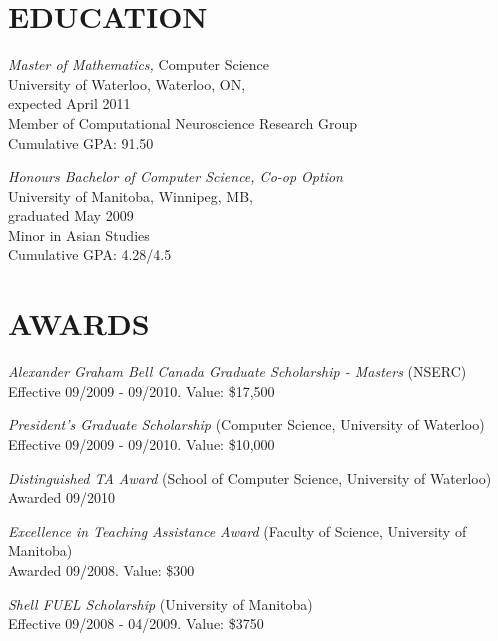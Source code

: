 \documentclass[line,margin]{res}
\begin{document}
\address{31 Mulberry Ln, Waterloo, ON}
\address{tbekolay@gmail.com $\cdot$ (519) 573-4815}


\begin{resume}

\section{EDUCATION}
  {\sl Master of Mathematics,} Computer Science \\
  University of Waterloo, Waterloo, ON, \\
  expected April 2011 \\
  Member of Computational Neuroscience Research Group \\
  Cumulative GPA: 91.50
  
  {\sl Honours Bachelor of Computer Science, Co-op Option} \\
  University of Manitoba, Winnipeg, MB, \\
  graduated May 2009 \\
  Minor in Asian Studies \\
  Cumulative GPA: 4.28/4.5

\section{AWARDS}
  {\sl Alexander Graham Bell Canada Graduate Scholarship - Masters} (NSERC) \\ 
  \hspace*{1cm} Effective 09/2009 - 09/2010. Value: \$17,500
  
  {\sl President's Graduate Scholarship} (Computer Science, University of Waterloo) \\
  \hspace*{1cm} Effective 09/2009 - 09/2010. Value: \$10,000
  
  {\sl Distinguished TA Award} (School of Computer Science, University of Waterloo) \\
  \hspace*{1cm} Awarded 09/2010
  
  {\sl Excellence in Teaching Assistance Award} (Faculty of Science, University of Manitoba) \\
  \hspace*{1cm} Awarded 09/2008. Value: \$300
  
  {\sl Shell FUEL Scholarship} (University of Manitoba) \\
  \hspace*{1cm} Effective 09/2008 - 04/2009. Value: \$3750
  

\end{resume}
\end{document}
